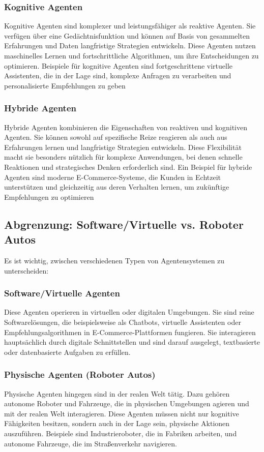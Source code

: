 \documentclass[conference]{IEEEtran}
\begin{document}
\subsubsection{Kognitive Agenten}
Kognitive Agenten sind komplexer und leistungsfähiger als reaktive Agenten. Sie verfügen über eine Gedächtnisfunktion und können auf Basis von gesammelten Erfahrungen und Daten langfristige Strategien entwickeln. Diese Agenten nutzen maschinelles Lernen und fortschrittliche Algorithmen, um ihre Entscheidungen zu optimieren. Beispiele für kognitive Agenten sind fortgeschrittene virtuelle Assistenten, die in der Lage sind, komplexe Anfragen zu verarbeiten und personalisierte Empfehlungen zu geben\cite{megherbi_hybrid_2012}

\subsubsection{Hybride Agenten}
Hybride Agenten kombinieren die Eigenschaften von reaktiven und kognitiven Agenten. Sie können sowohl auf spezifische Reize reagieren als auch aus Erfahrungen lernen und langfristige Strategien entwickeln. Diese Flexibilität macht sie besonders nützlich für komplexe Anwendungen, bei denen schnelle Reaktionen und strategisches Denken erforderlich sind. Ein Beispiel für hybride Agenten sind moderne E-Commerce-Systeme, die Kunden in Echtzeit unterstützen und gleichzeitig aus deren Verhalten lernen, um zukünftige Empfehlungen zu optimieren\cite{megherbi_hybrid_2012}

\subsection{Abgrenzung: Software/Virtuelle vs. Roboter Autos}
Es ist wichtig, zwischen verschiedenen Typen von Agentensystemen zu unterscheiden:

\subsubsection{Software/Virtuelle Agenten}
Diese Agenten operieren in virtuellen oder digitalen Umgebungen. Sie sind reine Softwarelösungen, die beispielsweise als Chatbots, virtuelle Assistenten oder Empfehlungsalgorithmen in E-Commerce-Plattformen fungieren. Sie interagieren hauptsächlich durch digitale Schnittstellen und sind darauf ausgelegt, textbasierte oder datenbasierte Aufgaben zu erfüllen\cite{v-hanki_was_2023}.

\subsubsection{Physische Agenten (Roboter Autos)}
Physische Agenten hingegen sind in der realen Welt tätig. Dazu gehören autonome Roboter und Fahrzeuge, die in physischen Umgebungen agieren und mit der realen Welt interagieren. Diese Agenten müssen nicht nur kognitive Fähigkeiten besitzen, sondern auch in der Lage sein, physische Aktionen auszuführen. Beispiele sind Industrieroboter, die in Fabriken arbeiten, und autonome Fahrzeuge, die im Straßenverkehr navigieren\cite{v-hanki_was_2023}.
\end{document}
